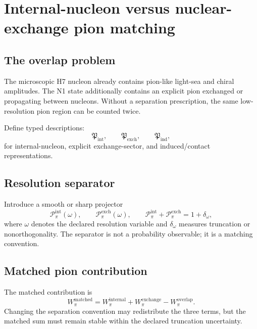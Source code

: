 \documentclass[11pt]{article}
\newcommand{\cP}{\mathcal P}
\begin{document}
\section{Internal-nucleon versus nuclear-exchange pion matching}
\label{sec:subtraction}

\subsection{The overlap problem}

The microscopic H7 nucleon already contains pion-like light-sea and chiral
amplitudes.  The N1 state additionally contains an explicit pion exchanged or
propagating between nucleons.  Without a separation prescription, the same
low-resolution pion region can be counted twice.

Define typed descriptions:
\begin{equation}
 \mathfrak P_{\mathrm{int}},
 \qquad
 \mathfrak P_{\mathrm{exch}},
 \qquad
 \mathfrak P_{\mathrm{ind}},
 \label{eq:pion-description-types}
\end{equation}
for internal-nucleon, explicit exchange-sector, and induced/contact
representations.

\subsection{Resolution separator}

Introduce a smooth or sharp projector
\begin{equation}
 \cP_{\pi}^{\mathrm{int}}(\omega),
 \qquad
 \cP_{\pi}^{\mathrm{exch}}(\omega),
 \qquad
 \cP_{\pi}^{\mathrm{int}}+\cP_{\pi}^{\mathrm{exch}}
 =1+\delta_{\omega},
 \label{eq:pion-separator}
\end{equation}
where \(\omega\) denotes the declared resolution variable and
\(\delta_{\omega}\) measures truncation or nonorthogonality.  The separator is
not a probability observable; it is a matching convention.

\subsection{Matched pion contribution}

The matched contribution is
\begin{equation}
 W_{\pi}^{\mathrm{matched}}
 =
 W_{\pi}^{\mathrm{internal}}
 +W_{\pi}^{\mathrm{exchange}}
 -W_{\pi}^{\mathrm{overlap}}.
 \label{eq:pion-matched-sum}
\end{equation}
Changing the separation convention may redistribute the three terms, but the
matched sum must remain stable within the declared truncation uncertainty.
\end{document}
